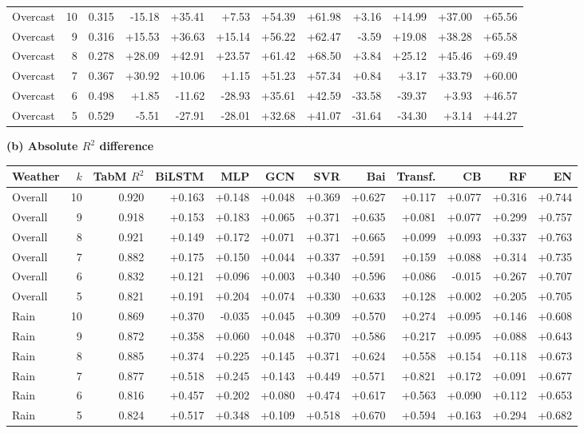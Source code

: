 \begin{table}[t]
\begin{tabular*}{\textwidth}{@{\extracolsep{\fill}}lrrrrrrrrrrr@{}}
Overcast & 10 & 0.315 & -15.18 & +35.41 & +7.53 & +54.39 & +61.98 & +3.16 & +14.99 & +37.00 & +65.56 \\
Overcast & 9 & 0.316 & +15.53 & +36.63 & +15.14 & +56.22 & +62.47 & -3.59 & +19.08 & +38.28 & +65.58 \\
Overcast & 8 & 0.278 & +28.09 & +42.91 & +23.57 & +61.42 & +68.50 & +3.84 & +25.12 & +45.46 & +69.49 \\
Overcast & 7 & 0.367 & +30.92 & +10.06 & +1.15 & +51.23 & +57.34 & +0.84 & +3.17 & +33.79 & +60.00 \\
Overcast & 6 & 0.498 & +1.85 & -11.62 & -28.93 & +35.61 & +42.59 & -33.58 & -39.37 & +3.93 & +46.57 \\
Overcast & 5 & 0.529 & -5.51 & -27.91 & -28.01 & +32.68 & +41.07 & -31.64 & -34.30 & +3.14 & +44.27 \\
\bottomrule
\end{tabular*}

\par\smallskip
\textbf{(b) Absolute $R^2$ difference}
\par\smallskip

\begin{tabular*}{\textwidth}{@{\extracolsep{\fill}}lrrrrrrrrrrr@{}}
\toprule
Weather & $k$ & TabM $R^2$ & BiLSTM & MLP & GCN &
SVR & Bai & Transf. & CB & RF & EN \\
\midrule

Overall & 10 & 0.920 & +0.163 & +0.148 & +0.048 & +0.369 & +0.627 & +0.117 & +0.077 & +0.316 & +0.744 \\
Overall & 9 & 0.918 & +0.153 & +0.183 & +0.065 & +0.371 & +0.635 & +0.081 & +0.077 & +0.299 & +0.757 \\
Overall & 8 & 0.921 & +0.149 & +0.172 & +0.071 & +0.371 & +0.665 & +0.099 & +0.093 & +0.337 & +0.763 \\
Overall & 7 & 0.882 & +0.175 & +0.150 & +0.044 & +0.337 & +0.591 & +0.159 & +0.088 & +0.314 & +0.735 \\
Overall & 6 & 0.832 & +0.121 & +0.096 & +0.003 & +0.340 & +0.596 & +0.086 & -0.015 & +0.267 & +0.707 \\
Overall & 5 & 0.821 & +0.191 & +0.204 & +0.074 & +0.330 & +0.633 & +0.128 & +0.002 & +0.205 & +0.705 \\
\midrule

Rain & 10 & 0.869 & +0.370 & -0.035 & +0.045 & +0.309 & +0.570 & +0.274 & +0.095 & +0.146 & +0.608 \\
Rain & 9 & 0.872 & +0.358 & +0.060 & +0.048 & +0.370 & +0.586 & +0.217 & +0.095 & +0.088 & +0.643 \\
Rain & 8 & 0.885 & +0.374 & +0.225 & +0.145 & +0.371 & +0.624 & +0.558 & +0.154 & +0.118 & +0.673 \\
Rain & 7 & 0.877 & +0.518 & +0.245 & +0.143 & +0.449 & +0.571 & +0.821 & +0.172 & +0.091 & +0.677 \\
Rain & 6 & 0.816 & +0.457 & +0.202 & +0.080 & +0.474 & +0.617 & +0.563 & +0.090 & +0.112 & +0.653 \\
Rain & 5 & 0.824 & +0.517 & +0.348 & +0.109 & +0.518 & +0.670 & +0.594 & +0.163 & +0.294 & +0.682 \\
\midrule


\end{tabular*}
\end{table}
